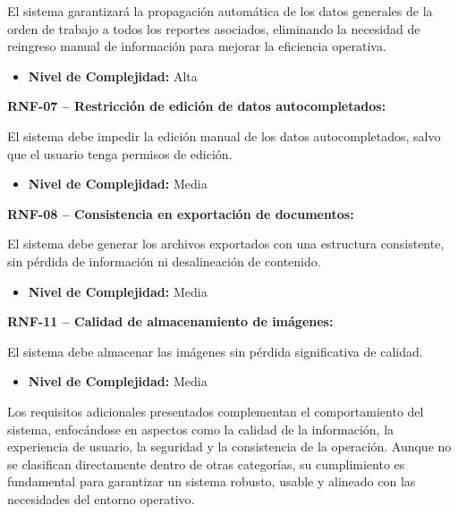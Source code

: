 \documentclass[12pt,a4paper]{article}
\begin{document}
El sistema garantizará la propagación automática de los datos generales de la orden de trabajo a todos los reportes asociados, eliminando la necesidad de reingreso manual de información para mejorar la eficiencia operativa.

\begin{itemize}
  \item \textbf{Nivel de Complejidad:} Alta
\end{itemize}

\textbf{RNF-07 – Restricción de edición de datos autocompletados:}

El sistema debe impedir la edición manual de los datos autocompletados, salvo que el usuario tenga permisos de edición.

\begin{itemize}
  \item \textbf{Nivel de Complejidad:} Media
\end{itemize}

\textbf{RNF-08 – Consistencia en exportación de documentos:}

El sistema debe generar los archivos exportados con una estructura consistente, sin pérdida de información ni desalineación de contenido.

\begin{itemize}
  \item \textbf{Nivel de Complejidad:} Media
\end{itemize}

\textbf{RNF-11 – Calidad de almacenamiento de imágenes:}

El sistema debe almacenar las imágenes sin pérdida significativa de calidad.

\begin{itemize}
  \item \textbf{Nivel de Complejidad:} Media
\end{itemize}

Los requisitos adicionales presentados complementan el comportamiento del sistema, enfocándose en aspectos como la calidad de la información, la experiencia de usuario, la seguridad y la consistencia de la operación. Aunque no se clasifican directamente dentro de otras categorías, su cumplimiento es fundamental para garantizar un sistema robusto, usable y alineado con las necesidades del entorno operativo.

\end{document}
